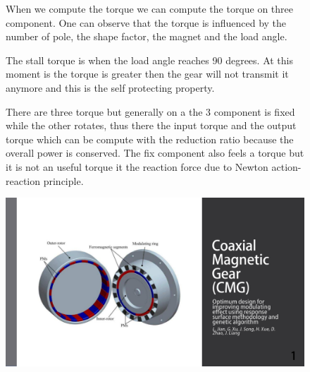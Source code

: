 \begin{figure}[H]
    \begin{minipage}{.45\linewidth}
        When we compute the torque we can compute the torque on three component. One can observe that the torque is influenced by the number of pole, the shape factor, the magnet and the load angle. 
        
        The stall torque is when the load angle reaches 90 degrees. At this moment is the torque is greater then the gear will not transmit it anymore and this is the self protecting property.
        
        There are three torque but generally on a the 3 component is fixed while the other rotates, thus there the input torque and the output torque which can be compute with the reduction ratio because the overall power is conserved. The fix component also feels a torque but it is not an useful torque it the reaction force due to Newton action-reaction principle. 
    \end{minipage}
    \hfill%
    \begin{minipage}[c]{.45\linewidth}
        \centering
        \includegraphics[page={31},width=\textwidth]{LELEC2311.allow.pdf}
    \end{minipage}
\end{figure}


